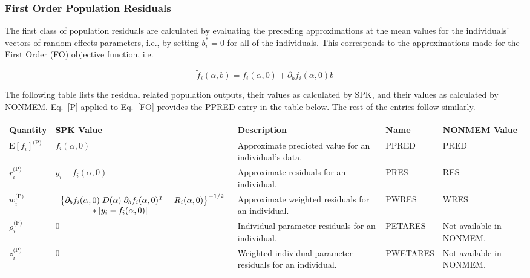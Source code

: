\documentclass{article}
\begin{document}
\subsubsection{First Order Population Residuals}

The first class of population residuals are calculated by evaluating the
preceding approximations at the mean values for the individuals'
vectors of random effects parameters, i.e., 
by setting $b^{\ast}_i = 0$ for all of the individuals.
This corresponds to the approximations made for the First Order (FO)
objective function, i.e. 

\begin{equation} \label{FO} \tilde{f}_i(\alpha, b) = f_i(\alpha, 0)+
\partial_b f_i(\alpha, 0)b \end{equation}

\newpage 

The following table lists the residual related population outputs, their
values as calculated by SPK, and their values as calculated by NONMEM.
Eq.~\ref{P} applied to Eq.~\ref{FO} provides the PPRED entry in the table
below. The rest of the entries follow similarly.

\begin{center}
\begin{tabular}{|p{0.75in}|p{3.25in}|p{1.1in}|p{0.85in}|p{1.0in}|}
\hline
\hline
  {\bf Quantity}
    & {\bf SPK Value}
    & {\bf Description}
    & {\bf Name}
    & {\bf NONMEM Value} \\
  \hline
  \hline
  $\mbox{E} \left[ f_i \right]^{\mbox{(P)}}$
    & $f_i(\alpha, 0)$
    & Approximate predicted value for an individual's data.
    & PPRED
    & PRED \\
  \hline
  $r^{\mbox{(P)}}_i$
    & $y_i - f_i(\alpha, 0)$
    & Approximate residuals for an individual.
    & PRES
    & RES \\
  \hline
  $w^{\mbox{(P)}}_i$
    & $\begin{array}{l}
        \left\{ \partial_b f_i(\alpha, 0) \;
          D(\alpha) \; \partial_b f_i(\alpha, 0)^T
          + R_i(\alpha, 0) \right\}^{-1/2} \\
        \mbox{\hspace{0.5in}}
        \ast [ y_i - f_i(\alpha, 0) ]
      \end{array} $
    & Approximate weighted residuals for an individual.
    & PWRES
    & WRES \\
  \hline
  $\rho^{\mbox{(P)}}_i$
    & $0$
    & Individual parameter residuals for an individual.
    & PETARES
    & Not available in NONMEM. \\
  \hline
  $z^{\mbox{(P)}}_i$
    & $0$
    & Weighted individual parameter residuals for an individual.
    & PWETARES
    & Not available in NONMEM. \\
  \hline
  \hline
\end{tabular}
\end{center}
\end{document}
